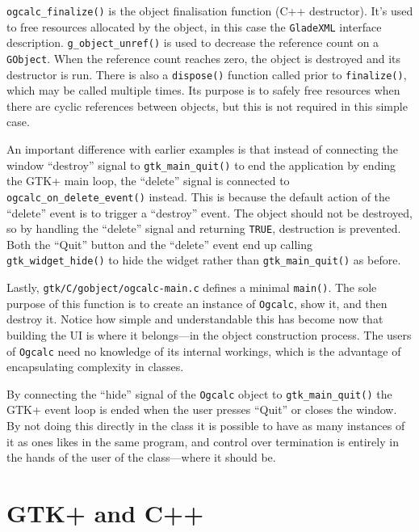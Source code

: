 \documentclass[a4paper,oneside]{article}
\newcommand{\filename}[1]{\texttt{#1}}
\newcommand{\class}[1]{\texttt{#1}}
\newcommand{\function}[1]{\texttt{#1()}}
\newcommand{\code}[1]{\texttt{#1}}
\begin{document}
\function{ogcalc\_finalize} is the object finalisation function (C++
destructor).  It's used to free resources allocated by the object, in
this case the \class{GladeXML} interface description.
\function{g\_object\_unref} is used to decrease the reference count on
a \class{GObject}.  When the reference count reaches zero, the object
is destroyed and its destructor is run.  There is also a
\function{dispose} function called prior to \function{finalize}, which
may be called multiple times.  Its purpose is to safely free resources
when there are cyclic references between objects, but this is not
required in this simple case.

An important difference with earlier examples is that instead of
connecting the window ``destroy'' signal to \function{gtk\_main\_quit}
to end the application by ending the GTK+ main loop, the ``delete''
signal is connected to \function{ogcalc\_on\_delete\_event} instead.
This is because the default action of the ``delete'' event is to
trigger a ``destroy'' event.  The object should not be destroyed, so
by handling the ``delete'' signal and returning \code{TRUE},
destruction is prevented.  Both the ``Quit'' button and the ``delete''
event end up calling \function{gtk\_widget\_hide} to hide the widget
rather than \function{gtk\_main\_quit} as before.

Lastly, \filename{gtk/C/gobject/ogcalc-main.c} defines a minimal
\function{main}.  The sole purpose of this function is to create an
instance of \class{Ogcalc}, show it, and then destroy it.  Notice how
simple and understandable this has become now that building the UI is
where it belongs---in the object construction process.  The users of
\class{Ogcalc} need no knowledge of its internal workings, which is
the advantage of encapsulating complexity in classes.

By connecting the ``hide'' signal of the \class{Ogcalc} object to
\function{gtk\_main\_quit} the GTK+ event loop is ended when the user
presses ``Quit'' or closes the window.  By not doing this directly in
the class it is possible to have as many instances of it as ones likes
in the same program, and control over termination is entirely in the
hands of the user of the class---where it should be.


\section{GTK+ and C++}

\label{sec:cxxglade}
\end{document}
